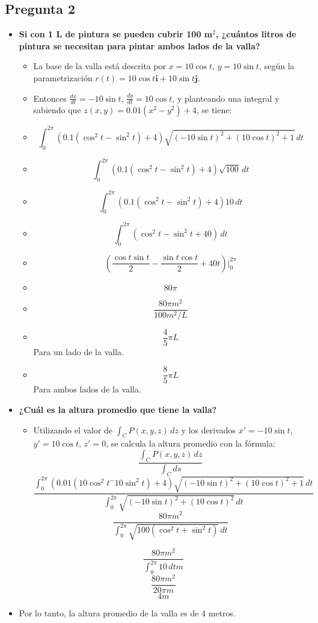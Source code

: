 \documentclass{article}
\begin{document}
\subsection*{Pregunta 2}
\begin{itemize}
    \item \textbf{Si con 1 L de pintura se pueden cubrir 100 m\(^2\), ¿cuántos litros de pintura se necesitan para pintar ambos lados de la valla?}
    \begin{itemize}
        \item La base de la valla está descrita por \( x = 10 \cos t \), \( y = 10 \sin t \), según la parametrización \( r(t) = 10 \cos t \mathbf{i} + 10 \sin t \mathbf{j} \).
        \item Entonces \(\frac{dx}{dt} = -10 \sin t \), \(\frac{dy}{dt} = 10 \cos t \), y planteando una integral y sabiendo que \(z(x, y) = 0.01(x^2 - y^2) + 4\), se tiene:
        \item \to\[ \int_{0}^{2\pi} \left(0.1( \cos^2 t - \sin^2 t) + 4\right) \sqrt{(-10 \sin t)^2 + (10 \cos t)^2 + 1} \, dt \]
        \item \to\[ \int_{0}^{2\pi} \left(0.1( \cos^2 t -  \sin^2 t) + 4\right) \sqrt{100} \, dt \]
        \item \to\[ \int_{0}^{2\pi} \left(0.1( \cos^2 t -  \sin^2 t) + 4\right) 10 \, dt \]
        \item \to\[ \int_{0}^{2\pi} \left( \cos^2 t -  \sin^2 t + 40\right) \, dt \]
        \item \to\[ (\frac{\cos t \sin t}{2} - \frac{\sin t \cos t}{2} + 40t) \Big|_{0}^{2\pi} \]
        \item \to\[ 80\pi \]
        \item \to \[ \frac{80\pi m^2}{100 m^2/L} \]
        \item \to \[ \frac{4}{5} \pi L \] Para un lado de la valla.
        \item \to \[ \frac{8}{5} \pi L \] Para ambos lados de la valla.

        
        
    \end{itemize}
    
    \item \textbf{¿Cuál es la altura promedio que tiene la valla?}
    \begin{itemize}
        \item Utilizando el valor de \( \int_{C} P(x, y, z) \, dz \) y los derivados \( x' = -10 \sin t \), \( y' = 10 \cos t \), \( z' = 0 \), se calcula la altura promedio con la fórmula:
        \[ \frac{\int_{C} P(x, y, z) \, dz}{\int_{C} ds} \] \to \[ \frac{\int_{0}^{2\pi} (0.01 (10 \cos^2 t^ - 10 \sin^2 t)+4) \sqrt{(-10 \sin t)^2 + (10 \cos t)^2 + 1} \, dt}{\int_{0}^{2\pi} \sqrt{(-10 \sin t)^2 + (10 \cos t)^2 } \, dt} \] \to         \[ \frac{80\pi m^2}{\int_{0}^{2\pi} \sqrt{100(\cos^2 t + \sin^2 t)} \, dt} \]   \end{itemize}
        \[ \frac{80\pi m^2}{\int_{0}^{2\pi} 10 \, dt m} \] \to \[ \frac{80\pi m^2}{20\pi m} \] \to \[ 4 m \]
        \item Por lo tanto, la altura promedio de la valla es de 4 metros.
    
    \end{itemize}
\end{document}
